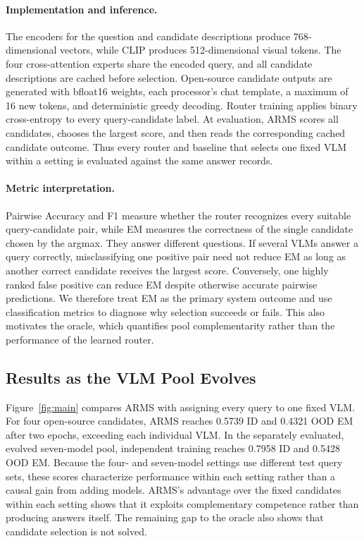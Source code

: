 \documentclass[letterpaper]{article}
\begin{document}
\paragraph{Implementation and inference.}
The encoders for the question and candidate descriptions produce 768-dimensional
vectors, while CLIP produces 512-dimensional visual tokens. The four
cross-attention experts share the encoded query, and all candidate descriptions
are cached before selection. Open-source candidate outputs are generated with
bfloat16 weights, each processor's chat template, a maximum of 16 new tokens,
and deterministic greedy decoding. Router training applies binary
cross-entropy to every query-candidate label. At evaluation, ARMS scores all
candidates, chooses the largest score, and then reads the corresponding cached
candidate outcome. Thus every router and baseline that selects one fixed VLM within a
setting is evaluated against the same answer records.

\paragraph{Metric interpretation.}
{
Pairwise Accuracy and F1 measure whether the router recognizes every suitable
query-candidate pair, while EM measures the correctness of the single candidate
chosen by the argmax. They answer different questions. If several VLMs answer a
query correctly, misclassifying one positive pair need not reduce EM as long as
another correct candidate receives the largest score. Conversely, one highly
ranked false positive can reduce EM despite otherwise accurate pairwise
predictions. We therefore treat EM as the primary system outcome and use
classification metrics to diagnose why selection succeeds or fails. This also
motivates the oracle, which quantifies pool complementarity rather than the
performance of the learned router.\par}

\subsection{Results as the VLM Pool Evolves}

Figure~\ref{fig:main} compares ARMS with assigning every query to one fixed VLM.
For four open-source candidates, ARMS reaches 0.5739 ID and 0.4321 OOD EM after
two epochs, exceeding each individual VLM. In the separately evaluated,
evolved seven-model pool, independent training reaches 0.7958 ID and 0.5428 OOD
EM. Because the four- and seven-model settings use different test query sets,
these scores characterize performance within each setting rather than a causal
gain from adding models. ARMS's advantage over the fixed candidates within each
setting shows that it exploits complementary competence rather than producing
answers itself. The remaining gap to the oracle also shows that candidate
selection is not solved.
\end{document}
